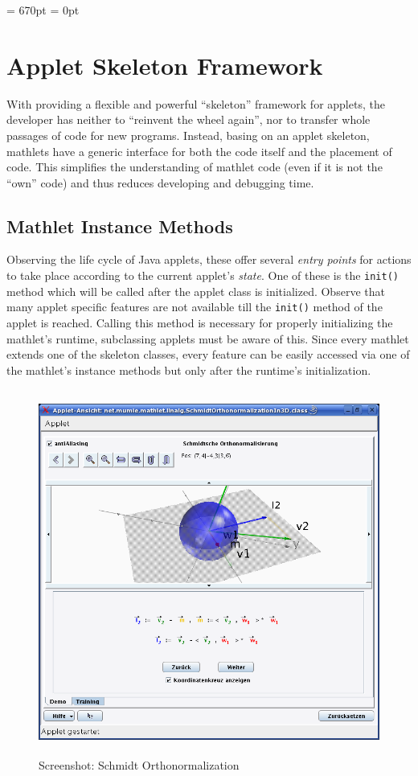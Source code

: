 \documentclass[a4paper,12pt]{article}
\newcommand{\codename}[1]{\texttt{\small #1}}
\begin{document}
\textheight = 670pt
\newpage
\footskip = 0pt

\section{Applet Skeleton Framework}

With providing a flexible and powerful ``skeleton'' framework for applets, the developer has neither to
``reinvent the wheel again'', nor to transfer whole passages of code for new programs. Instead, basing
on an applet skeleton, mathlets have a generic interface for both the code itself and the placement of
code. This simplifies the understanding of mathlet code (even if it is not the ``own'' code) and thus
reduces developing and debugging time.

\subsection{Mathlet Instance Methods}

Observing the life cycle of Java applets, these offer several \textit{entry points} for actions to take
place according to the current applet's \textit{state}. One of these is the \codename{init()} method which 
will be called after the applet class is initialized. Observe that many applet specific features are not
available till the \codename{init()} method of the applet is reached. Calling this method is necessary for 
properly initializing the mathlet's runtime, subclassing applets must be aware of this.
Since every mathlet extends one of the skeleton classes, every feature can be easily accessed via one
of the mathlet's instance methods but only after the runtime's initialization.

\begin{figure}[h]
  \begin{center}
    \includegraphics[height=12cm]
      {images/screenshot_schmidt_orthonormalization.png}
    \caption{Screenshot: Schmidt Orthonormalization}
  \end{center}
\end{figure}
\end{document}
